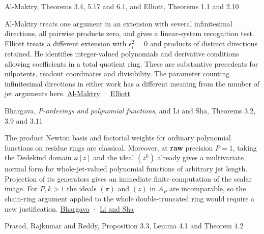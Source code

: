 \documentclass[11pt,a4paper]{article}
\newlength{\OfflineResearchTableWidth}
\newcommand{\OfflineResearchRow}{\par}
\newenvironment{OfflineResearchTable}{%
  \par\medskip\begingroup\small\setlength{\parindent}{0pt}%
  \setlength{\parskip}{3pt plus 1pt minus .5pt}%
  \setlength{\OfflineResearchTableWidth}{\linewidth}%
}{%
  \par\endgroup\medskip%
}
\begin{document}
\begin{OfflineResearchTable}
\begin{minipage}[t]{0.67095\OfflineResearchTableWidth}
\end{minipage}%
\OfflineResearchRow
\noindent%
\begin{minipage}[t]{0.27405\OfflineResearchTableWidth}\raggedright
Al-Maktry, Theorems 3.4, 5.17 and 6.1, and Elliott, Theorems 1.1 and
2.10
\end{minipage}\hfill%
\begin{minipage}[t]{0.67095\OfflineResearchTableWidth}\raggedright
Al-Maktry treats one argument in an extension with several
infinitesimal directions, all pairwise products zero, and gives a
linear-system recognition test. Elliott treats a different extension
with \(\epsilon_i^2=0\) and products of distinct directions retained. He
identifies integer-valued polynomials and derivative conditions allowing
coefficients in a total quotient ring. These are substantive precedents
for nilpotents, readout coordinates and divisibility. The parameter
counting infinitesimal directions in either work has a different meaning
from the number of jet arguments here.
\href{https://arxiv.org/pdf/2002.01304}{Al-Maktry} ·
\href{https://arxiv.org/pdf/1608.00171}{Elliott}
\end{minipage}%
\OfflineResearchRow
\noindent%
\begin{minipage}[t]{0.27405\OfflineResearchTableWidth}\raggedright
Bhargava, \emph{P-orderings and polynomial functions}, and Li and Sha,
Theorems 3.2, 3.9 and 3.11
\end{minipage}\hfill%
\begin{minipage}[t]{0.67095\OfflineResearchTableWidth}\raggedright
The product Newton basis and factorial
weights for ordinary polynomial functions on residue rings are
classical. Moreover, at \textbf{raw} precision \(P=1\), taking the
Dedekind domain \(\kappa[z]\) and the ideal \((z^k)\) already gives a
multivariate normal form for whole-jet-valued polynomial functions of
arbitrary jet length. Projection of its generators gives an immediate
finite computation of the scalar image. For \(P,k>1\) the ideals
\((\pi)\) and \((z)\) in \(A_P\) are incomparable, so the chain-ring
argument applied to the whole double-truncated ring would require a new
justification.
\href{https://doi.org/10.1515/crll.1997.490.101}{Bhargava} ·
\href{https://arxiv.org/pdf/1704.04965}{Li and Sha}
\end{minipage}%
\OfflineResearchRow
\noindent%
\begin{minipage}[t]{0.27405\OfflineResearchTableWidth}\raggedright
Prasad, Rajkumar and Reddy, Proposition 3.3, Lemma 4.1 and Theorem 4.2
\end{minipage}\hfill%

\end{OfflineResearchTable}
\end{document}
